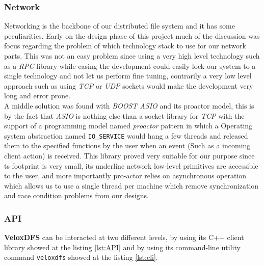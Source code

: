
\subsubsection{Network}
Networking is the backbone of our distributed file system and it has some
peculiarities. Early on the design phase of this project much of the discussion
was focus regarding the problem of which technology stack to use for our
network parts. This was not an easy problem since using a very high level
technology such as a \textit{RPC} library while easing the development could
easily lock our system to a single technology and not let us perform fine
tuning, contrarily a very low level approach such as using \textit{TCP} or
\textit{UDP} sockets would make the development very long and error prone. \\

A middle solution was found with \textit{BOOST ASIO} and its proactor model,
this is by the fact that \textit{ASIO} is nothing else than a socket library
for \textit{TCP} with the support of a programming model named
\textit{proactor} \cite{pyarali1997proactor} pattern in which a Operating
system abstraction named \texttt{IO\_SERVICE} would hang a few threads and
released them to the specified functions by the user when an event (Such as a
incoming client action) is received. This library proved very suitable for our
purpose since ts  footprint is very small, its underline network low-level
primitives are accessible to the user, and more importantly pro-actor relies on
asynchronous operation which allows us to use a single thread per machine which
remove synchronization and race condition problems from our designs.

\subsubsection{API}

\textbf{VeloxDFS} can be interacted at two different levels, by using its C++
client library showed at the listing \ref{lst:API} and by using its
command-line utility command \texttt{veloxdfs} showed at the listing
\ref{lst:cli}. \\

